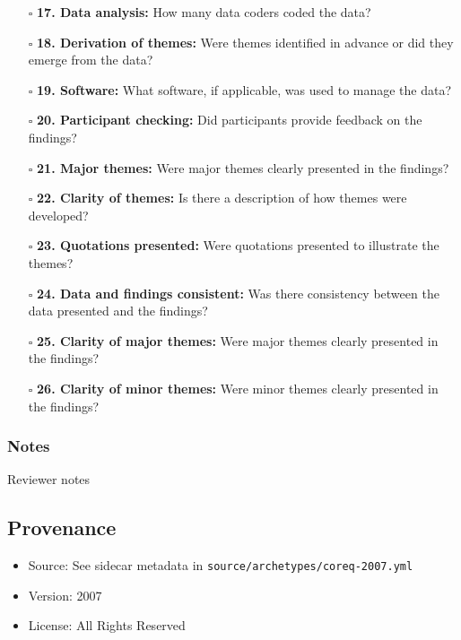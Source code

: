 \documentclass[11pt]{article}
\def\tightlist{}
\begin{document}
\begin{Form}
\begin{itemize}
\tightlist
\item[$\square$]
  \textbf{17. Data analysis:} How many data coders coded the data?
\item[$\square$]
  \textbf{18. Derivation of themes:} Were themes identified in advance
  or did they emerge from the data?
\item[$\square$]
  \textbf{19. Software:} What software, if applicable, was used to
  manage the data?
\item[$\square$]
  \textbf{20. Participant checking:} Did participants provide feedback
  on the findings?
\item[$\square$]
  \textbf{21. Major themes:} Were major themes clearly presented in the
  findings?
\item[$\square$]
  \textbf{22. Clarity of themes:} Is there a description of how themes
  were developed?
\item[$\square$]
  \textbf{23. Quotations presented:} Were quotations presented to
  illustrate the themes?
\item[$\square$]
  \textbf{24. Data and findings consistent:} Was there consistency
  between the data presented and the findings?
\item[$\square$]
  \textbf{25. Clarity of major themes:} Were major themes clearly
  presented in the findings?
\item[$\square$]
  \textbf{26. Clarity of minor themes:} Were minor themes clearly
  presented in the findings?
\end{itemize}

\subsubsection{Notes}\label{notes}

{Reviewer notes}

\subsection{Provenance}\label{provenance}

\begin{itemize}
\tightlist
\item
  Source: See sidecar metadata in
  \texttt{source/archetypes/coreq-2007.yml}
\item
  Version: 2007
\item
  License: All Rights Reserved
\end{itemize}

\end{Form}
\end{document}

